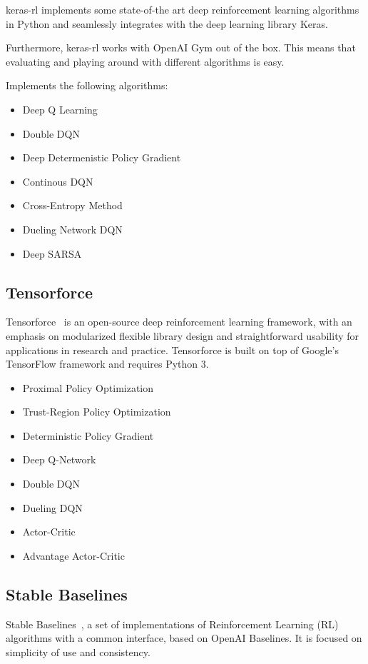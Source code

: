 \documentclass[letterpaper, 10 pt]{IEEEconf}
\begin{document}
keras-rl\cite{plappert2016kerasrl} implements some state-of-the art deep reinforcement learning
algorithms in Python and seamlessly integrates with the deep learning
library Keras.

Furthermore, keras-rl works with OpenAI Gym out of the box. This means
that evaluating and playing around with different algorithms is easy.

Implements the following algorithms:

\begin{itemize}
	\item Deep Q Learning
	\item Double DQN
	\item Deep Determenistic Policy Gradient
	\item Continous DQN
	\item Cross-Entropy Method
	\item Dueling Network DQN
	\item Deep SARSA
\end{itemize}

\subsection{Tensorforce}

Tensorforce~\cite{tensorforce} is an open-source deep reinforcement
learning framework, with an emphasis on modularized flexible library
design and straightforward usability for applications in research and
practice. Tensorforce is built on top of Google's TensorFlow framework
and requires Python 3.

\begin{itemize}
	\item Proximal Policy Optimization
	\item Trust-Region Policy Optimization
	\item Deterministic Policy Gradient
	\item Deep Q-Network
	\item Double DQN
	\item Dueling DQN
	\item Actor-Critic
	\item Advantage Actor-Critic
\end{itemize}

\subsection{Stable Baselines}

Stable Baselines~\cite{stable-baselines}, a set of implementations of
Reinforcement Learning (RL) algorithms with a common interface, based
on OpenAI Baselines. It is focused on simplicity of use and
consistency.
\end{document}
